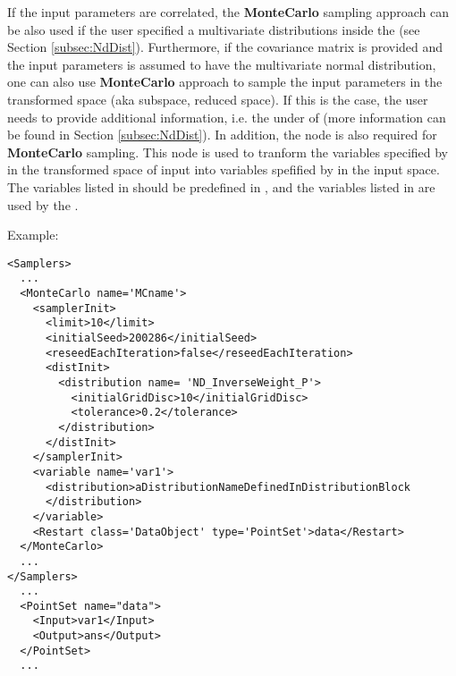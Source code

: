If the input parameters are correlated, the \textbf{MonteCarlo} sampling approach can be also used if the user specified a
multivariate distributions inside the  (see Section \ref{subsec:NdDist}). Furthermore, if the
covariance matrix is provided and the input parameters is assumed to have the multivariate normal distribution, one can also use
\textbf{MonteCarlo} approach to sample the input parameters in the transformed space (aka subspace, reduced space). If this is
the case, the user needs to provide additional information, i.e. the  under  of
 (more information can be found in Section \ref{subsec:NdDist}). In addition, the node
 is also required for \textbf{MonteCarlo} sampling. This node is used to tranform the variables
specified by  in the transformed space of input into variables spefified by 
in the input space. The variables listed in  should be predefined in , and the variables
listed in  are used by the .


Example:
\begin{lstlisting}[style=XML]
<Samplers>
  ...
  <MonteCarlo name='MCname'>
    <samplerInit>
      <limit>10</limit>
      <initialSeed>200286</initialSeed>
      <reseedEachIteration>false</reseedEachIteration>
      <distInit>
        <distribution name= 'ND_InverseWeight_P'>
          <initialGridDisc>10</initialGridDisc>
          <tolerance>0.2</tolerance>
        </distribution>
      </distInit>
    </samplerInit>
    <variable name='var1'>
      <distribution>aDistributionNameDefinedInDistributionBlock
      </distribution>
    </variable>
    <Restart class='DataObject' type='PointSet'>data</Restart>
  </MonteCarlo>
  ...
</Samplers>
  ...
  <PointSet name="data">
    <Input>var1</Input>
    <Output>ans</Output>
  </PointSet>
  ...
\end{lstlisting}

